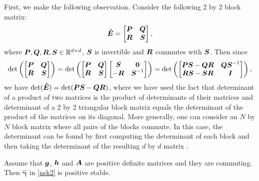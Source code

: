 First, we make the following observation. Consider the following 2 by 2 block matrix:\begin{equation}
\boldsymbol{\hat{E}} = \begin{bmatrix}
       \boldsymbol{P} & \boldsymbol{Q}  \\ 
       \boldsymbol{R} & \boldsymbol{S}  \\
     \end{bmatrix},\end{equation}
where $\boldsymbol{P},\boldsymbol{Q},\boldsymbol{R},\boldsymbol{S} \in \mathbb{R}^{d \times d}$, $\boldsymbol{S}$ is invertible and $\boldsymbol{R}$ commutes with $\boldsymbol{S}$. Then since
\begin{equation}\det \left( \begin{bmatrix}
       \boldsymbol{P} & \boldsymbol{Q}  \\ 
       \boldsymbol{R} & \boldsymbol{S}  \\
     \end{bmatrix}  \right)  =
\det \left( \begin{bmatrix}
       \boldsymbol{P} & \boldsymbol{Q}  \\ 
       \boldsymbol{R} & \boldsymbol{S}  \\
     \end{bmatrix} \begin{bmatrix}
       \boldsymbol{S} & \boldsymbol{0}  \\ 
       -\boldsymbol{R} & \boldsymbol{S}^{-1}  \\
     \end{bmatrix} \right) = \det \left( \begin{bmatrix}
       \boldsymbol{PS}-\boldsymbol{QR} & \boldsymbol{Q}\boldsymbol{S}^{-1}  \\ 
       \boldsymbol{RS}-\boldsymbol{SR} & \boldsymbol{I}  \\
     \end{bmatrix} \right),  \end{equation}
we have $\det(\boldsymbol{\hat{E}}) = \det(\boldsymbol{PS}-\boldsymbol{QR})$, where we have used the fact that determinant of a product of two matrices is the product of determinants of their matrices and determinant of a 2 by 2 triangular block matrix equals the determinant of the product of the matrices on its diagonal. More generally, one can consider an $N$ by $N$ block matrix where all pairs of the blocks commute. In this case, the determinant can be found by first computing the determinant of each block and  then taking the determinant of the resulting $d$ by $d$ matrix \cite{silvester2000determinants}.


\begin{lemma}  \label{linalg1}
Assume that $\boldsymbol{g}$, $\boldsymbol{h}$ and $\boldsymbol{A}$ are positive definite matrices and they are commuting. Then $\boldsymbol{\hat{\gamma}}$ in \eqref{nsk2} is positive stable.
\end{lemma}


